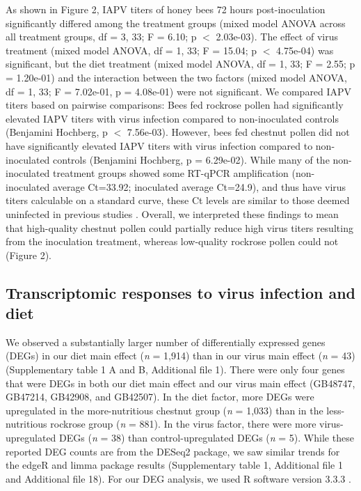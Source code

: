 \documentclass{bmcart}
\begin{document}
\begin{linenumbers}
\begin{doublespacing}
As shown in Figure 2, IAPV titers of honey bees 72 hours post-inoculation significantly differed among the treatment groups (mixed model ANOVA across all treatment groups, df = 3, 33; F = 6.10; p $<$ 2.03e-03). The effect of virus treatment (mixed model ANOVA, df = 1, 33; F = 15.04; p $<$ 4.75e-04) was significant, but the diet treatment (mixed model ANOVA, df = 1, 33; F = 2.55; p = 1.20e-01) and the interaction between the two factors (mixed model ANOVA, df = 1, 33; F = 7.02e-01, p = 4.08e-01) were not significant. We compared IAPV titers  based on pairwise comparisons: Bees fed rockrose pollen had significantly elevated IAPV titers with virus infection compared to non-inoculated controls (Benjamini Hochberg, p $<$ 7.56e-03). However, bees fed chestnut pollen did not have significantly elevated IAPV titers with virus infection compared to non-inoculated controls (Benjamini Hochberg, p = 6.29e-02). While many of the non-inoculated treatment groups showed some RT-qPCR amplification (non-inoculated average Ct=33.92; inoculated average Ct=24.9), and thus have virus titers calculable on a standard curve, these Ct levels are similar to those deemed uninfected in previous studies \cite{galbraith}. Overall, we interpreted these findings to mean that high-quality chestnut pollen could partially reduce high virus titers resulting from the inoculation treatment, whereas low-quality rockrose pollen could not (Figure 2).

\subsection*{Transcriptomic responses to virus infection and diet}

We observed a substantially larger number of differentially expressed genes (DEGs) in our diet main effect (\textit{n} = 1,914) than in our virus main effect (\textit{n} = 43) (Supplementary table 1 A and B, Additional file 1). There were only four genes that were DEGs in both our diet main effect and our virus main effect (GB48747, GB47214, GB42908, and GB42507). In the diet factor, more DEGs were upregulated in the more-nutritious chestnut group (\textit{n} = 1,033) than in the less-nutritious rockrose group (\textit{n} = 881). In the virus factor, there were more virus-upregulated DEGs (\textit{n} = 38) than control-upregulated DEGs (\textit{n} = 5). While these reported DEG counts are from the DESeq2 package, we saw similar trends for the edgeR and limma package results (Supplementary table 1, Additional file 1 and Additional file 18). For our DEG analysis, we used R software version 3.3.3 \cite{R}.


\end{doublespacing}
\end{linenumbers}
\end{document}
